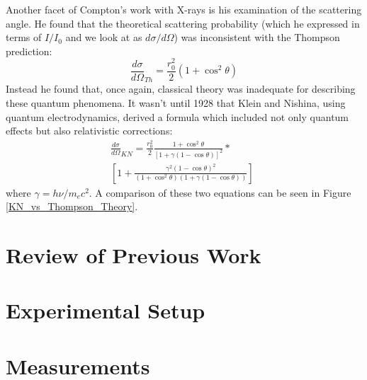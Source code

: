 \documentclass[%
 reprint,
 amsmath,amssymb,
 aps,
 pra,
]{revtex4-1}
\begin{document}
Another facet of Compton's work with X-rays is his examination of the scattering angle. He found that the theoretical scattering probability (which he expressed in terms of $I/I_0$ and we look at as $d\sigma / d\Omega$) was inconsistent with the Thompson prediction:
\begin{equation}\label{eq:thompson}
	\frac{d \sigma}{d \Omega}_{Th} = \frac{r_0^2}{2}(1+\cos^2{\theta})
\end{equation}
Instead he found that, once again, classical theory was inadequate for describing these quantum phenomena. It wasn't until 1928 that Klein and Nishina, using quantum electrodynamics, derived a formula which included not only quantum effects but also relativistic corrections:
\begin{gather}
	\frac{d \sigma}{d \Omega}_{KN} = \frac{r_0^2}{2} \frac{1 + \cos^2{\theta}}{[1 + \gamma(1 - \cos{\theta})]^2} \nonumber * ~~~~~~~~~~~~ \\
	\left[ 1 + \frac{\gamma^2(1 - \cos{\theta})^2}{(1 + \cos^2{\theta})(1+ \gamma(1 - \cos{\theta}))}\right] 
	\label{eq:kn}
\end{gather}
where $\gamma = h\nu / m_e c^2$. A comparison of these two equations can be seen in Figure \ref{KN_vs_Thompson_Theory}.

\section{Review of Previous Work}

\section{Experimental Setup}

\section{Measurements}
\end{document}
